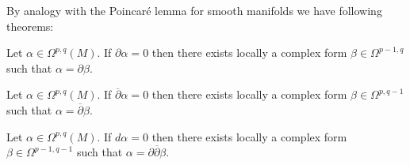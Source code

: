 	By analogy with the Poincar\'e lemma for smooth manifolds we have following theorems:
	\begin{theorem}
		Let $\alpha\in\Omega^{p, q}(M)$. If $\partial\alpha = 0$ then there exists locally a complex form $\beta\in\Omega^{p-1, q}$ such that $\alpha = \partial\beta$.
	\end{theorem}
	\begin{theorem}
		Let $\alpha\in\Omega^{p, q}(M)$. If $\overline{\partial}\alpha = 0$ then there exists locally a complex form $\beta\in\Omega^{p, q-1}$ such that $\alpha = \overline{\partial}\beta$.
	\end{theorem}
	\begin{theorem}\label{complex:del_delbar_lemma}
		Let $\alpha\in\Omega^{p, q}(M)$. If $d\alpha = 0$ then there exists locally a complex form $\beta\in\Omega^{p-1, q-1}$ such that $\alpha = \partial\overline{\partial}\beta$.
	\end{theorem}
